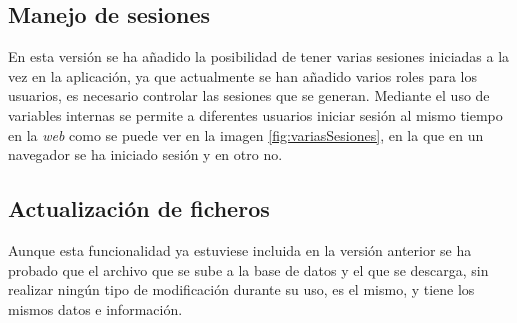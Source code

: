 
\subsection{Manejo de sesiones}

En esta versión se ha añadido la posibilidad de tener varias sesiones iniciadas a la vez en la aplicación, ya que actualmente se han añadido varios roles para los usuarios, es necesario controlar las sesiones que se generan. Mediante el uso de variables internas se permite a diferentes usuarios iniciar sesión al mismo tiempo en la \emph{web} como se puede ver en la imagen \ref{fig:variasSesiones}, en la que en un navegador se ha iniciado sesión y en otro no.


\subsection{Actualización de ficheros}

Aunque esta funcionalidad ya estuviese incluida en la versión anterior se ha probado que el archivo que se sube a la base de datos y el que se descarga, sin realizar ningún tipo de modificación durante su uso, es el mismo, y tiene los mismos datos e información.